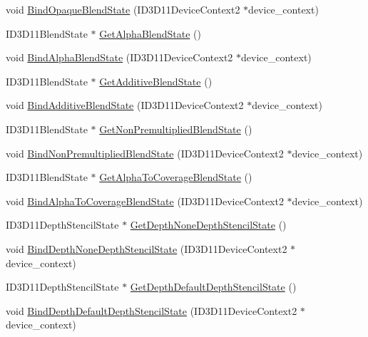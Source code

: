 \begin{DoxyCompactItemize}
void \hyperlink{structmage_1_1_rendering_state_cache_a2844150e11df2527cb5cc22570140c3a}{Bind\+Opaque\+Blend\+State} (I\+D3\+D11\+Device\+Context2 $\ast$device\+\_\+context)
\item 
I\+D3\+D11\+Blend\+State $\ast$ \hyperlink{structmage_1_1_rendering_state_cache_a19ad72ad35096722e3d61e58e0ab9205}{Get\+Alpha\+Blend\+State} ()
\item 
void \hyperlink{structmage_1_1_rendering_state_cache_ae75ffcffc15495f968044f200923b702}{Bind\+Alpha\+Blend\+State} (I\+D3\+D11\+Device\+Context2 $\ast$device\+\_\+context)
\item 
I\+D3\+D11\+Blend\+State $\ast$ \hyperlink{structmage_1_1_rendering_state_cache_afa897dcd0b71e4ff8e6ce6d8e31aaa71}{Get\+Additive\+Blend\+State} ()
\item 
void \hyperlink{structmage_1_1_rendering_state_cache_a8c5922566dc5a27a59d2ceeeda588122}{Bind\+Additive\+Blend\+State} (I\+D3\+D11\+Device\+Context2 $\ast$device\+\_\+context)
\item 
I\+D3\+D11\+Blend\+State $\ast$ \hyperlink{structmage_1_1_rendering_state_cache_ae1b3d9745e1761e45908d9ad7c4f29dd}{Get\+Non\+Premultiplied\+Blend\+State} ()
\item 
void \hyperlink{structmage_1_1_rendering_state_cache_ad01ce1d0d09206ef1d47fb736663013e}{Bind\+Non\+Premultiplied\+Blend\+State} (I\+D3\+D11\+Device\+Context2 $\ast$device\+\_\+context)
\item 
I\+D3\+D11\+Blend\+State $\ast$ \hyperlink{structmage_1_1_rendering_state_cache_a736e11f05e6721ef2e7e1951a4216079}{Get\+Alpha\+To\+Coverage\+Blend\+State} ()
\item 
void \hyperlink{structmage_1_1_rendering_state_cache_ac4e48cadea14a33c545ef6cd95971114}{Bind\+Alpha\+To\+Coverage\+Blend\+State} (I\+D3\+D11\+Device\+Context2 $\ast$device\+\_\+context)
\item 
I\+D3\+D11\+Depth\+Stencil\+State $\ast$ \hyperlink{structmage_1_1_rendering_state_cache_a5885a7c2a375bcb37d2139e04e162ecd}{Get\+Depth\+None\+Depth\+Stencil\+State} ()
\item 
void \hyperlink{structmage_1_1_rendering_state_cache_acac2a4705b73dae906e36a4cd52d05d8}{Bind\+Depth\+None\+Depth\+Stencil\+State} (I\+D3\+D11\+Device\+Context2 $\ast$device\+\_\+context)
\item 
I\+D3\+D11\+Depth\+Stencil\+State $\ast$ \hyperlink{structmage_1_1_rendering_state_cache_aaa928ab554db5e83354bca7f7d82308d}{Get\+Depth\+Default\+Depth\+Stencil\+State} ()
\item 
void \hyperlink{structmage_1_1_rendering_state_cache_ab280d0bf64ab85dbb66b3d1632fa40b1}{Bind\+Depth\+Default\+Depth\+Stencil\+State} (I\+D3\+D11\+Device\+Context2 $\ast$device\+\_\+context)

\end{DoxyCompactItemize}
